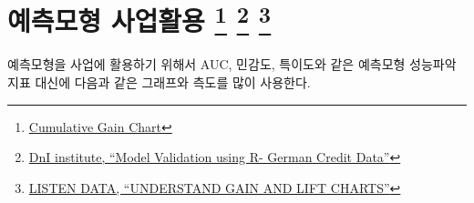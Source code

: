 \documentclass[
  letterpaper,
  chapter,a4paper,showtrims,openright,hidelinks]{oblivoir}
\newenvironment{Shaded}{\begin{snugshade}}{\end{snugshade}}
\newcommand{\AttributeTok}[1]{\textcolor[rgb]{0.40,0.45,0.13}{#1}}
\newcommand{\CommentTok}[1]{\textcolor[rgb]{0.37,0.37,0.37}{#1}}
\newcommand{\ConstantTok}[1]{\textcolor[rgb]{0.56,0.35,0.01}{#1}}
\newcommand{\DecValTok}[1]{\textcolor[rgb]{0.68,0.00,0.00}{#1}}
\newcommand{\FunctionTok}[1]{\textcolor[rgb]{0.28,0.35,0.67}{#1}}
\newcommand{\NormalTok}[1]{\textcolor[rgb]{0.00,0.23,0.31}{#1}}
\newcommand{\OtherTok}[1]{\textcolor[rgb]{0.00,0.23,0.31}{#1}}
\newcommand{\SpecialCharTok}[1]{\textcolor[rgb]{0.37,0.37,0.37}{#1}}
\newcommand{\StringTok}[1]{\textcolor[rgb]{0.13,0.47,0.30}{#1}}
\begin{document}
\begin{Shaded}
\end{Shaded}

\hypertarget{predictive-model-caret-business}{%
\chapter[예측모형 사업활용 ]{\texorpdfstring{예측모형 사업활용
\footnote{\href{http://mlwiki.org/index.php/Cumulative_Gain_Chart}{Cumulative
  Gain Chart}} \footnote{\href{http://dni-institute.in/blogs/model-validation-using-r-german-credit-data/}{DnI
  institute, ``Model Validation using R- German Credit Data''}}
\footnote{\href{https://www.listendata.com/2014/08/excel-template-gain-and-lift-charts.html}{LISTEN
  DATA, ``UNDERSTAND GAIN AND LIFT CHARTS''}}}{예측모형 사업활용   }}\label{predictive-model-caret-business}}

예측모형을 사업에 활용하기 위해서 AUC, 민감도, 특이도와 같은 예측모형
성능파악 지표 대신에 다음과 같은 그래프와 측도를 많이 사용한다.
\end{document}
